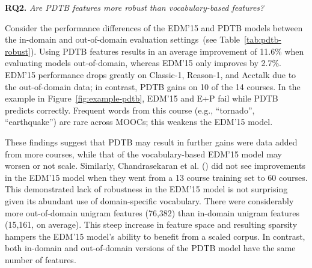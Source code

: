 \documentclass[letterpaper]{article}
\begin{document}
\noindent \textbf{RQ2.} {\it Are PDTB features more robust than vocabulary-based  features?}

Consider the performance differences of the EDM'15 and PDTB models between the 
in-domain and out-of-domain evaluation 
settings~(see Table~\ref{tab:pdtb-robust}). 
Using PDTB features results in an average improvement of 11.6\% when 
evaluating models out-of-domain, whereas EDM'15 only improves by 2.7\%.
EDM'15 performance drops greatly on {\sc Classic-1}, {\sc Reason-1}, and {\sc 
Acctalk} due to the out-of-domain data; in contrast, PDTB gains on 
10 of the 14 courses. In the example in Figure~\ref{fig:example-pdtb}, EDM'15 
and E+P fail while PDTB predicts correctly. Frequent words from this course 
(e.g., ``tornado'', ``earthquake'') are rare across MOOCs; this weakens the 
EDM'15 model. 

These findings suggest that PDTB may result in further gains were data added 
from more courses, while that of the vocabulary-based EDM'15 model may worsen or 
not scale. Similarly, Chandrasekaran et al. 
(\citeyear{chandrasekaran2015learning}) 
did not see improvements in the EDM'15 model when they went from a 13 course 
training set to 60 courses. This demonstrated lack of robustness in the EDM'15
model is not surprising given its abundant use of domain-specific vocabulary. 
There were considerably more out-of-domain unigram features (76,382) than 
in-domain unigram features (15,161, on average). This steep increase in feature 
space and resulting sparsity hampers the EDM'15 model's ability to benefit from 
a scaled corpus. In contrast, both in-domain and out-of-domain versions of the 
PDTB model have the same number of features.

\end{document}
